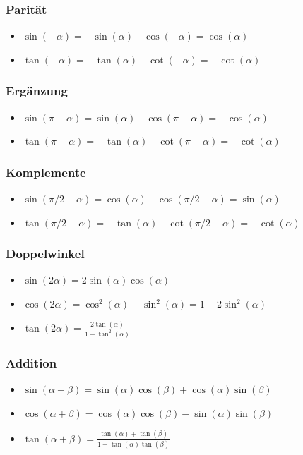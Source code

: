 \documentclass[8pt]{article}
\begin{document}
\begin{multicols*}{3}
\subsubsection{Parität}
\begin{itemize}
 \item $\sin(-\alpha) = - \sin(\alpha) \quad \cos(-\alpha) = \cos(\alpha)$
 \item $\tan(-\alpha) = - \tan(\alpha) \quad \cot(-\alpha) = - \cot(\alpha)$
\end{itemize}

\subsubsection{Ergänzung}
\begin{itemize}
 \item $\sin(\pi - \alpha) = \sin(\alpha) \quad \cos(\pi - \alpha) = - \cos(\alpha)$
 \item $\tan(\pi - \alpha) = -\tan(\alpha) \quad \cot(\pi - \alpha) = - \cot(\alpha)$
\end{itemize}


\subsubsection{Komplemente}
\begin{itemize}
 \item $\sin(\pi/2 - \alpha) = \cos(\alpha) \quad \cos(\pi/2 - \alpha) = \sin(\alpha)$
 \item $\tan(\pi/2 - \alpha) = -\tan(\alpha) \quad \cot(\pi/2 - \alpha) = -\cot(\alpha)$
\end{itemize}

\subsubsection{Doppelwinkel}
\begin{itemize}
 \item $\sin(2\alpha) = 2 \sin(\alpha) \cos(\alpha)$
 \item $\cos(2\alpha) = \cos^2(\alpha) - \sin^2(\alpha) = 1 - 2 \sin^2(\alpha)$
 \item $\tan(2\alpha) = \frac{2\tan(\alpha)}{1 - \tan^2(\alpha)}$
\end{itemize}

\subsubsection{Addition}
\begin{itemize}
 \item $\sin(\alpha + \beta) = \sin(\alpha) \cos(\beta) + \cos(\alpha) \sin(\beta)$
 \item $\cos(\alpha + \beta) = \cos(\alpha) \cos(\beta) - \sin(\alpha) \sin(\beta)$
 \item $\tan(\alpha + \beta) = \frac{\tan(\alpha) + \tan(\beta)}{1 - \tan(\alpha) \tan(\beta)}$
\end{itemize}


\end{multicols*}
\end{document}
